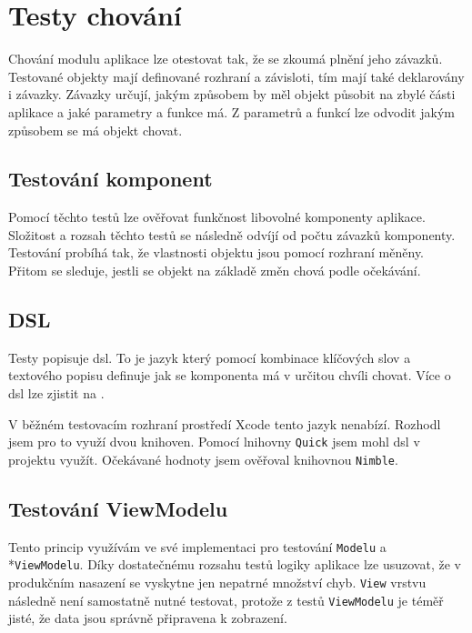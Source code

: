 \section{Testy chování}\label{testovani-bdd}

Chování modulu aplikace lze otestovat tak, že se zkoumá plnění jeho závazků.
Testované objekty mají definované rozhraní a závisloti, tím mají také deklarovány i závazky.
Závazky určují, jakým způsobem by měl objekt působit na zbylé části aplikace a jaké parametry a funkce má.
Z parametrů a funkcí lze odvodit jakým způsobem se má objekt chovat.

\subsection{Testování komponent}

Pomocí těchto testů lze ověřovat funkčnost libovolné komponenty aplikace.
Složitost a rozsah těchto testů se následně odvíjí od počtu závazků komponenty.
Testování probíhá tak, že vlastnosti objektu jsou pomocí rozhraní měněny.
Přitom se sleduje, jestli se objekt na základě změn chová podle očekávání. \cite{objcio-bdd}

\subsection{DSL}

Testy popisuje \acrfull{dsl}.
To je jazyk který pomocí kombinace klíčových slov a textového popisu definuje jak se komponenta má v určitou chvíli chovat.
Více o \acrshort{dsl} lze zjistit na \cite{petrikainulainen-dsl}.

V běžném testovacím rozhraní prostředí Xcode tento jazyk nenabízí.
Rozhodl jsem pro to využí dvou knihoven.
Pomocí lnihovny \texttt{Quick} jsem mohl \acrshort{dsl} v projektu využít.
Očekávané hodnoty jsem ověřoval knihovnou \texttt{Nimble}.

\subsection{Testování ViewModelu}

Tento princip využívám ve své implementaci pro testování \texttt{Modelu} a\\*\texttt{ViewModelu}.
Díky dostatečnému rozsahu testů logiky aplikace lze usuzovat, že v produkčním nasazení se vyskytne jen nepatrné množství chyb.
\texttt{View} vrstvu následně není samostatně nutné testovat, protože z testů \texttt{ViewModelu} je téměř jisté, že data jsou správně připravena k zobrazení.


